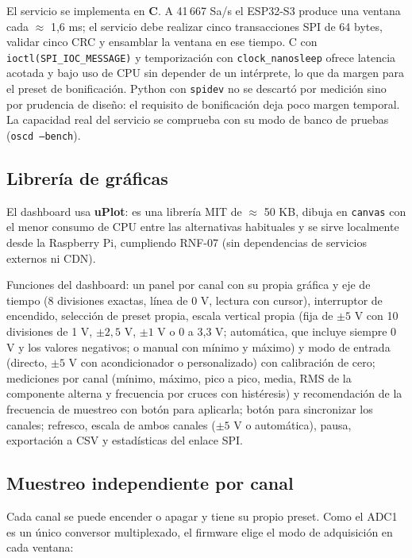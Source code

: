 \documentclass[12pt,a4paper]{article}
\begin{document}
El servicio se implementa en \textbf{C}. A 41\,667 Sa/s el ESP32-S3 produce una ventana cada $\approx$ 1{,}6 ms; el servicio debe realizar cinco transacciones SPI de 64 bytes, validar cinco CRC y ensamblar la ventana en ese tiempo. C con \texttt{ioctl(SPI\_IOC\_MESSAGE)} y temporización con \texttt{clock\_nanosleep} ofrece latencia acotada y bajo uso de CPU sin depender de un intérprete, lo que da margen para el preset de bonificación. Python con \texttt{spidev} no se descartó por medición sino por prudencia de diseño: el requisito de bonificación deja poco margen temporal. La capacidad real del servicio se comprueba con su modo de banco de pruebas (\texttt{oscd --bench}).

\subsection{Librería de gráficas}

El dashboard usa \textbf{uPlot}: es una librería MIT de $\approx$ 50 KB, dibuja en \texttt{canvas} con el menor consumo de CPU entre las alternativas habituales y se sirve localmente desde la Raspberry Pi, cumpliendo RNF-07 (sin dependencias de servicios externos ni CDN).

Funciones del dashboard: un panel por canal con su propia gráfica y eje de tiempo (8 divisiones exactas, línea de 0 V, lectura con cursor), interruptor de encendido, selección de preset propia, escala vertical propia (fija de $\pm 5$ V con 10 divisiones de 1 V, $\pm 2{,}5$ V, $\pm 1$ V o 0 a 3{,}3 V; automática, que incluye siempre 0 V y los valores negativos; o manual con mínimo y máximo) y modo de entrada (directo, $\pm 5$ V con acondicionador o personalizado) con calibración de cero; mediciones por canal (mínimo, máximo, pico a pico, media, RMS de la componente alterna y frecuencia por cruces con histéresis) y recomendación de la frecuencia de muestreo con botón para aplicarla; botón para sincronizar los canales; refresco, escala de ambos canales ($\pm 5$ V o automática), pausa, exportación a CSV y estadísticas del enlace SPI.

\subsection{Muestreo independiente por canal}

Cada canal se puede encender o apagar y tiene su propio preset. Como el ADC1 es un único conversor multiplexado, el firmware elige el modo de adquisición en cada ventana:
\end{document}
